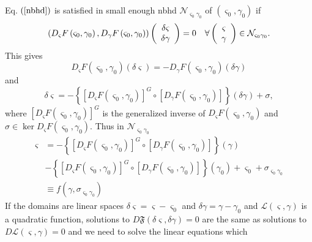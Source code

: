 \documentclass[aps,preprint]{revtex4}%
\begin{document}
Eq. $\left(  \ref{nbhd}\right)  $ is satisfied in small enough nbhd
$\mathcal{N}_{\varsigma_{0}\gamma_{0}}$ of $\left(  \varsigma_{0},\gamma
_{0}\right)  $ if
\begin{equation}
\left(  D_{\varsigma}F\left(  \varsigma_{0},\gamma_{0}\right)  ,D_{\gamma
}F\left(  \varsigma_{0},\gamma_{0}\right)  \right)  \left(
\begin{array}
[c]{c}%
\delta\varsigma\\
\delta\gamma
\end{array}
\right)  =0\quad\forall\left(
\begin{array}
[c]{c}%
\varsigma\\
\gamma
\end{array}
\right)  \in\mathcal{N}_{\varsigma_{0}\gamma_{0}}.
\end{equation}
This gives
\begin{equation}
D_{\varsigma}F\left(  \varsigma_{0},\gamma_{0}\right)  \left(  \delta
\varsigma\right)  =-D_{\gamma}F\left(  \varsigma_{0},\gamma_{0}\right)
\left(  \delta\gamma\right)
\end{equation}
and
\begin{equation}
\delta\varsigma=-\left\{  \left[  D_{\varsigma}F\left(  \varsigma_{0}%
,\gamma_{0}\right)  \right]  ^{G}\circ\left[  D_{\gamma}F\left(  \varsigma
_{0},\gamma_{0}\right)  \right]  \right\}  \left(  \delta\gamma\right)
+\sigma,
\end{equation}
where $\left[  D_{\varsigma}F\left(  \varsigma_{0},\gamma_{0}\right)  \right]
^{G}$ is the generalized inverse of $D_{\varsigma}F\left(  \varsigma
_{0},\gamma_{0}\right)  $ and $\sigma\in\ker D_{\varsigma}F\left(
\varsigma_{0},\gamma_{0}\right)  .$ Thus in $\mathcal{N}_{\varsigma_{0}%
\gamma_{0}}$
\begin{align}
\varsigma &  =-\left\{  \left[  D_{\varsigma}F\left(  \varsigma_{0},\gamma
_{0}\right)  \right]  ^{G}\circ\left[  D_{\gamma}F\left(  \varsigma_{0}%
,\gamma_{0}\right)  \right]  \right\}  \left(  \gamma\right) \\
&  -\left\{  \left[  D_{\varsigma}F\left(  \varsigma_{0},\gamma_{0}\right)
\right]  ^{G}\circ\left[  D_{\gamma}F\left(  \varsigma_{0},\gamma_{0}\right)
\right]  \right\}  \left(  \gamma_{0}\right)  +\varsigma_{0}+\sigma
_{\varsigma_{0}\gamma_{0}}\\
&  \equiv f\left(  \gamma,\sigma_{\varsigma_{0}\gamma_{0}}\right)
\end{align}
If the domains are linear spaces $\delta\varsigma=\varsigma-\varsigma_{0}$ and
$\delta\gamma=\gamma-\gamma_{0}$ and $\mathcal{L}\left(  \varsigma
,\gamma\right)  $ is a quadratic function, solutions to $D\mathfrak{F}\left(
\delta\varsigma,\delta\gamma\right)  =0$ are the same as solutions to
$D\mathcal{L}\left(  \varsigma,\gamma\right)  =0$ and we need to solve the
linear equations which
\end{document}
